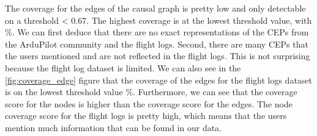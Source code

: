The coverage for the edges of the causal graph is pretty low and only detectable on a threshold < 0.67.
The highest coverage is at the lowest threshold value, with \%.
We can first deduce that there are no exact representations of the \ac{CEP}s from the ArduPilot community and the flight logs.
Second, there are many \ac{CEP}s that the users mentioned and are not reflected in the flight logs.
This is not surprising because the flight log dataset is limited.
We can also see in the \autoref{fig:coverage_edge} figure that the coverage of the edges for the flight logs dataset is on the lowest threshold value \%.
Furthermore, we can see that the coverage score for the nodes is higher than the coverage score for the edges.
The node coverage score for the flight logs is pretty high, which means that the users mention much information that can be found in our data.

